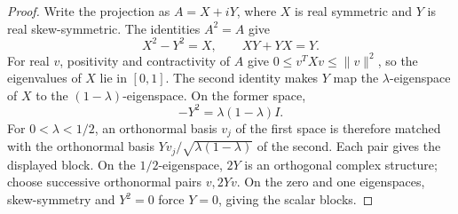 \begin{proof}
Write the projection as $A=X+iY$, where $X$ is real symmetric and
$Y$ is real skew-symmetric. The identities $A^2=A$ give
\[
 X^2-Y^2=X,\qquad XY+YX=Y.
\]
For real $v$, positivity and contractivity of $A$ give
$0\leq v^TXv\leq\|v\|^2$, so the eigenvalues of $X$ lie in $[0,1]$.
The second identity makes $Y$ map the $\lambda$-eigenspace of $X$
to the $(1-\lambda)$-eigenspace. On the former space,
\[
 -Y^2=\lambda(1-\lambda)I.
\]
For $0<\lambda<1/2$, an orthonormal basis $v_j$ of the first space
is therefore matched with the orthonormal basis
$Yv_j/\sqrt{\lambda(1-\lambda)}$ of the second. Each pair gives
the displayed block. On the $1/2$-eigenspace, $2Y$ is an orthogonal
complex structure; choose successive orthonormal pairs $v,2Yv$.
On the zero and one eigenspaces, skew-symmetry and $Y^2=0$ force
$Y=0$, giving the scalar blocks.
\end{proof}

